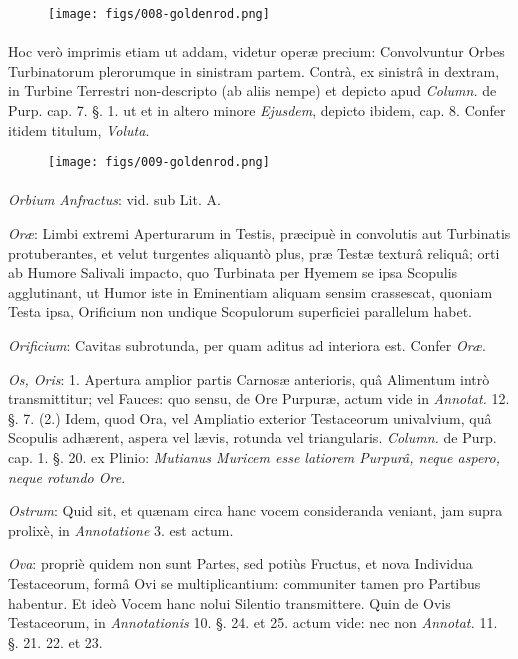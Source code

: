 \documentclass[a4paper, 11pt, oneside, polutonikogreek, german]{article}
\begin{document}
\begin{figure}[H]
\centering
\texttt{[image: figs/008-goldenrod.png]}
\end{figure}
\paragraph{}
Hoc verò imprimis etiam ut addam, videtur operæ precium: Convolvuntur Orbes Turbinatorum plerorumque in sinistram partem. Contrà, ex sinistrâ in dextram, in Turbine Terrestri non-descripto (ab aliis nempe) et depicto apud \emph{Column.} de Purp. cap. 7. §. 1. ut et in altero minore \emph{Ejusdem}, depicto ibidem, cap. 8. Confer itidem titulum, \emph{Voluta}.

\begin{figure}[H]
\centering
\texttt{[image: figs/009-goldenrod.png]}
\end{figure}
\paragraph{}
\emph{Orbium Anfractus}: vid. sub Lit. A.

\emph{Oræ}: Limbi extremi Aperturarum in Testis, præcipuè in convolutis aut Turbinatis protuberantes, et velut turgentes aliquantò plus, præ Testæ texturâ reliquâ; orti ab Humore Salivali impacto, quo Turbinata per Hyemem se ipsa Scopulis agglutinant, ut Humor iste in Eminentiam aliquam sensim crassescat, quoniam Testa ipsa, Orificium non undique Scopulorum superficiei parallelum habet.

\emph{Orificium}: Cavitas subrotunda, per quam aditus ad interiora est. Confer \emph{Oræ}.

\emph{Os, Oris}: 1. Apertura amplior partis Carnosæ anterioris, quâ Alimentum intrò transmittitur; vel Fauces: quo sensu, de Ore Purpuræ, actum vide in \emph{Annotat.} 12. §. 7. (2.) Idem, quod Ora, vel Ampliatio exterior Testaceorum univalvium, quâ Scopulis adhærent, aspera vel lævis, rotunda vel triangularis. \emph{Column.} de Purp. cap. 1. §. 20. ex Plinio: \emph{Mutianus Muricem esse latiorem Purpurâ, neque aspero, neque rotundo Ore.}

\emph{Ostrum}: Quid sit, et quænam circa hanc vocem consideranda veniant, jam supra prolixè, in \emph{Annotatione} 3. est actum.

\emph{Ova}: propriè quidem non sunt Partes, sed potiùs Fructus, et nova Individua Testaceorum, formâ Ovi se multiplicantium: communiter tamen pro Partibus habentur. Et ideò Vocem hanc nolui Silentio transmittere. Quin de Ovis Testaceorum, in \emph{Annotationis} 10. §. 24. et 25. actum vide: nec non \emph{Annotat.} 11. §. 21. 22. et 23.
\end{document}
